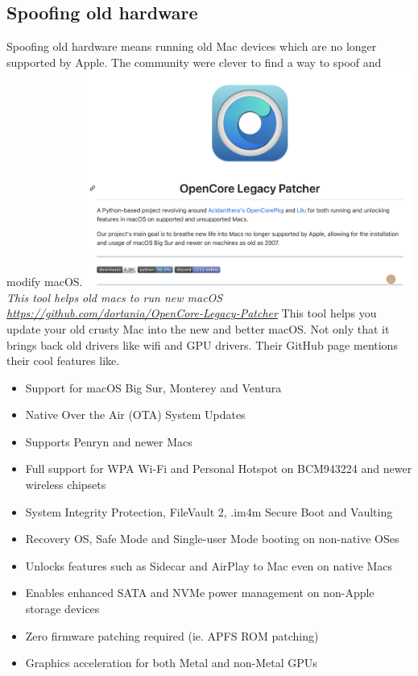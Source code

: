 \documentclass[12pt, letterpaper]{article}
\begin{document}
\subsection{Spoofing old hardware}
Spoofing old hardware means running old Mac devices which are no longer supported by Apple. The community were clever to find a way to spoof and modify macOS.
\hfill\break
\hfill\break
\includegraphics[width=0.8\textwidth]{fotos/PSP/Research/Lucy patcher/IMG_0807.jpeg}
\break
\emph{This tool helps old macs to run new macOS \url{https://github.com/dortania/OpenCore-Legacy-Patcher}}
\hfill\break
\hfill\break
This tool helps you update your old crusty Mac into the new and better macOS. Not only that it brings back old drivers like wifi and GPU drivers. Their GitHub page mentions their cool features like.
\begin{itemize}
    \item Support for macOS Big Sur, Monterey and Ventura
    \item Native Over the Air (OTA) System Updates
    \item Supports Penryn and newer Macs
    \item Full support for WPA Wi-Fi and Personal Hotspot on BCM943224 and newer wireless chipsets
    \item System Integrity Protection, FileVault 2, .im4m Secure Boot and Vaulting
    \item Recovery OS, Safe Mode and Single-user Mode booting on non-native OSes
    \item Unlocks features such as Sidecar and AirPlay to Mac even on native Macs
    \item Enables enhanced SATA and NVMe power management on non-Apple storage devices
    \item Zero firmware patching required (ie. APFS ROM patching)
    \item Graphics acceleration for both Metal and non-Metal GPUs
\end{itemize}
\newpage
\end{document}
